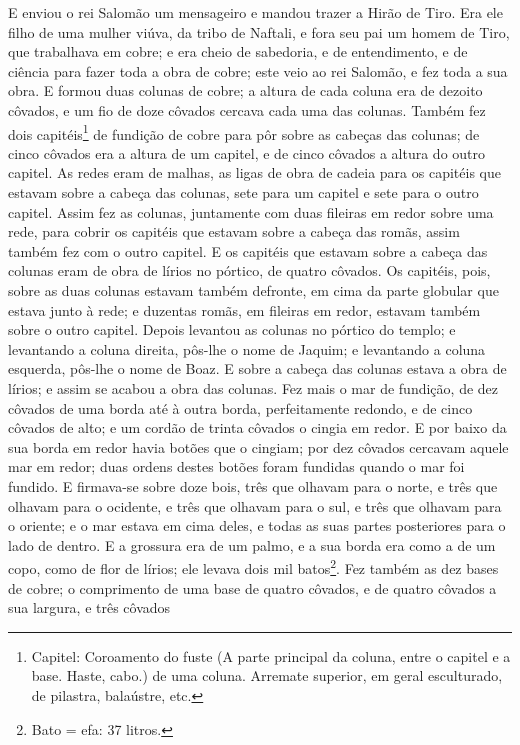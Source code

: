 E enviou o rei Salomão um mensageiro e mandou trazer a Hirão de
Tiro. Era ele filho de uma mulher viúva, da tribo de Naftali,
e fora seu pai um homem de Tiro, que trabalhava em cobre; e era
cheio de sabedoria, e de entendimento, e de ciência para fazer toda
a obra de cobre; este veio ao rei Salomão, e fez toda a sua obra.
E formou duas colunas de cobre; a altura de cada coluna era
de dezoito côvados, e um fio de doze côvados cercava cada uma das
colunas. Também fez dois capitéis\footnote{Capitel:
Coroamento do fuste (A parte principal da coluna, entre o capitel e
a base. Haste, cabo.) de uma coluna. Arremate superior, em geral
esculturado, de pilastra, balaústre, etc.} de fundição de cobre para
pôr sobre as cabeças das colunas; de cinco côvados era a altura de
um capitel, e de cinco côvados a altura do outro capitel. As
redes eram de malhas, as ligas de obra de cadeia para os capitéis
que estavam sobre a cabeça das colunas, sete para um capitel e sete
para o outro capitel. Assim fez as colunas, juntamente com
duas fileiras em redor sobre uma rede, para cobrir os capitéis que
estavam sobre a cabeça das romãs, assim também fez com o outro
capitel. E os capitéis que estavam sobre a cabeça das colunas
eram de obra de lírios no pórtico, de quatro côvados. Os
capitéis, pois, sobre as duas colunas estavam também defronte, em
cima da parte globular que estava junto à rede; e duzentas romãs, em
fileiras em redor, estavam também sobre o outro capitel.
Depois levantou as colunas no pórtico do templo; e levantando
a coluna direita, pôs-lhe o nome de Jaquim; e levantando a coluna
esquerda, pôs-lhe o nome de Boaz. E sobre a cabeça das
colunas estava a obra de lírios; e assim se acabou a obra das
colunas. Fez mais o mar de fundição, de dez côvados de uma
borda até à outra borda, perfeitamente redondo, e de cinco côvados
de alto; e um cordão de trinta côvados o cingia em redor. E
por baixo da sua borda em redor havia botões que o cingiam; por dez
côvados cercavam aquele mar em redor; duas ordens destes botões
foram fundidas quando o mar foi fundido. E firmava-se sobre
doze bois, três que olhavam para o norte, e três que olhavam para o
ocidente, e três que olhavam para o sul, e três que olhavam para o
oriente; e o mar estava em cima deles, e todas as suas partes
posteriores para o lado de dentro. E a grossura era de um
palmo, e a sua borda era como a de um copo, como de flor de lírios;
ele levava dois mil batos\footnote{Bato = efa: 37 litros.}.
Fez também as dez bases de cobre; o comprimento de uma base
de quatro côvados, e de quatro côvados a sua largura, e três côvados
